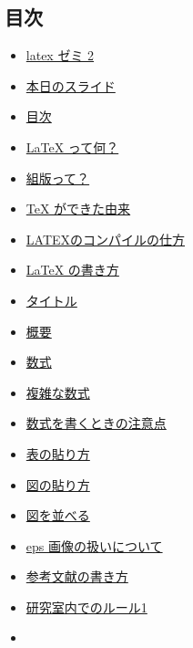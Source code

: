 \hypertarget{ux76eeux6b21}{\subsection{目次}\label{ux76eeux6b21}}

\begin{itemize}
\tightlist
\item
  \protect\hyperlink{latex-ux30bcux30df-2}{latex ゼミ 2}
\item
  \protect\hyperlink{ux672cux65e5ux306eux30b9ux30e9ux30a4ux30c9}{本日のスライド}
\item
  \protect\hyperlink{ux76eeux6b21}{目次}
\item
  \protect\hyperlink{latex-ux3063ux3066ux4f55}{LaTeX って何？}
\item
  \protect\hyperlink{ux7d44ux7248ux3063ux3066}{組版って？}
\item
  \protect\hyperlink{tex-ux304cux3067ux304dux305fux7531ux6765}{TeX
  ができた由来}
\item
  \protect\hyperlink{latexux306eux30b3ux30f3ux30d1ux30a4ux30ebux306eux4ed5ux65b9}{LATEXのコンパイルの仕方}
\item
  \protect\hyperlink{latex-ux306eux66f8ux304dux65b9}{LaTeX の書き方}
\item
  \protect\hyperlink{ux30bfux30a4ux30c8ux30eb}{タイトル}
\item
  \protect\hyperlink{ux6982ux8981}{概要}
\item
  \protect\hyperlink{ux6570ux5f0f}{数式}
\item
  \protect\hyperlink{ux8907ux96d1ux306aux6570ux5f0f}{複雑な数式}
\item
  \protect\hyperlink{ux6570ux5f0fux3092ux66f8ux304fux3068ux304dux306eux6ce8ux610fux70b9}{数式を書くときの注意点}
\item
  \protect\hyperlink{ux8868ux306eux8cbcux308aux65b9}{表の貼り方}
\item
  \protect\hyperlink{ux56f3ux306eux8cbcux308aux65b9}{図の貼り方}
\item
  \protect\hyperlink{ux56f3ux3092ux4e26ux3079ux308b}{図を並べる}
\item
  \protect\hyperlink{eps-ux753bux50cfux306eux6271ux3044ux306bux3064ux3044ux3066}{eps
  画像の扱いについて}
\item
  \protect\hyperlink{ux53c2ux8003ux6587ux732eux306eux66f8ux304dux65b9}{参考文献の書き方}
\item
  \protect\hyperlink{ux7814ux7a76ux5ba4ux5185ux3067ux306eux30ebux30fcux30eb1}{研究室内でのルール1}
\item

\end{itemize}
